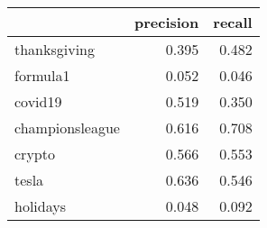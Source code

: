 \begin{tabular}{lrr}
\toprule
{} &  precision &  recall \\
\midrule
thanksgiving    &      0.395 &   0.482 \\
formula1        &      0.052 &   0.046 \\
covid19         &      0.519 &   0.350 \\
championsleague &      0.616 &   0.708 \\
crypto          &      0.566 &   0.553 \\
tesla           &      0.636 &   0.546 \\
holidays        &      0.048 &   0.092 \\
\bottomrule
\end{tabular}
